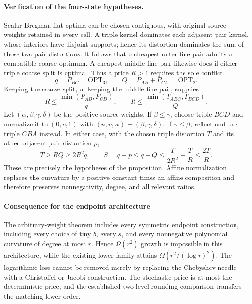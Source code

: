\documentclass[11pt]{article}
\begin{document}
\paragraph{Verification of the four-state hypotheses.}
Scalar Bregman flat optima can be chosen contiguous, with original source
weights retained in every cell. A triple kernel dominates each adjacent
pair kernel, whose interiors have disjoint supports; hence its distortion
dominates the sum of those two pair distortions. It follows that a cheapest
outer fine pair admits a compatible coarse optimum. A cheapest middle fine
pair likewise does if either triple coarse split is optimal. Thus a price
$R>1$ requires the sole conflict
\[
 q=P_{BC}=\mathrm{OPT}_3,\qquad
 Q=P_{AB}+P_{CD}=\mathrm{OPT}_2.
\]
Keeping the coarse split, or keeping the middle fine pair, supplies
\[
 R\le\frac{\min(P_{AB},P_{CD})}{q},\qquad
 R\le\frac{\min(T_{ABC},T_{BCD})}{Q}.
\]
Let $(\alpha,\beta,\gamma,\delta)$ be the positive source weights.
If $\beta\le\gamma$, choose triple $BCD$ and normalize it to
$(0,c,1)$ with $(u,v,w)=(\beta,\gamma,\delta)$.
If $\gamma\le\beta$, reflect and use triple $CBA$ instead.
In either case, with the chosen triple distortion $T$ and its other
adjacent pair distortion $p$,
\[
 T\ge RQ\ge2R^2q,\qquad
 S=q+p\le q+Q\le\frac{T}{2R^2}+\frac{T}{R}\le\frac{2T}{R}.
\]
These are precisely the hypotheses of the proposition. Affine normalization
replaces the curvature by a positive constant times an affine composition
and therefore preserves nonnegativity, degree, and all relevant ratios.

\paragraph{Consequence for the endpoint architecture.}
The arbitrary-weight theorem includes every symmetric endpoint construction,
including every choice of tiny $b$, every $s$, and every nonnegative
polynomial curvature of degree at most $r$. Hence $\Omega(r^2)$ growth is
impossible in this architecture, while the existing lower family attains
$\Omega(r^2/(\log r)^2)$. The logarithmic loss cannot be removed merely by
replacing the Chebyshev needle with a Christoffel or Jacobi construction.
The stochastic price is at most the deterministic price, and the established
two-level rounding comparison transfers the matching lower order.
\end{document}
